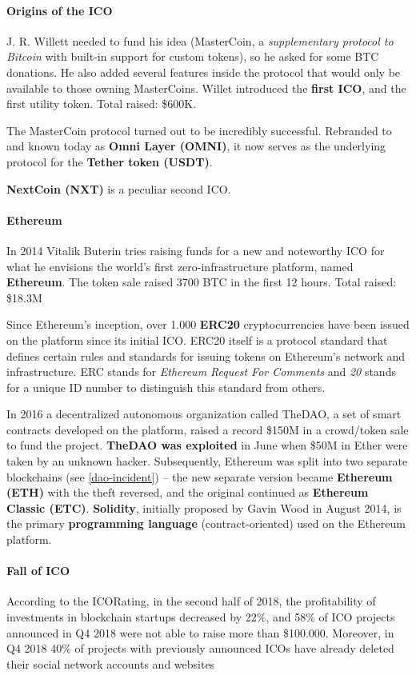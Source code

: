 \paragraph{Origins of the ICO} J. R. Willett needed to fund his idea (MasterCoin, a \emph{supplementary protocol to Bitcoin} with built-in support for custom tokens), so he asked for some BTC donations. He also added several features inside the protocol that would only be available to those owning MasterCoins.
Willet introduced the \textbf{first ICO}, and the first utility token.
Total raised: \$600K.

The MasterCoin protocol turned out to be incredibly successful. Rebranded to and known today as \textbf{Omni Layer (OMNI)}, it now serves as the underlying protocol for the \textbf{Tether token (USDT)}.

\textbf{NextCoin (NXT)} is a peculiar second ICO.

\paragraph{Ethereum}
In 2014 Vitalik Buterin tries raising funds for a new and noteworthy ICO for what he envisions the world's first zero-infrastructure platform, named \textbf{Ethereum}.
The token sale raised 3700 BTC in the first 12 hours.
Total raised: \$18.3M

Since Ethereum's inception, over 1.000 \textbf{ERC20} cryptocurrencies have been issued on the platform since its initial ICO. ERC20 itself is a protocol standard that defines certain rules and standards for issuing tokens on Ethereum's network and infrastructure. ERC stands for \emph{Ethereum Request For Comments} and \emph{20} stands for a unique ID number to distinguish this standard from others.

In 2016 a decentralized autonomous organization called TheDAO, a set of smart contracts developed on the platform, raised a record \$150M in a crowd/token sale to fund the project. \textbf{TheDAO was exploited} in June when \$50M in Ether were taken by an unknown hacker. Subsequently, Ethereum was split into two separate blockchains (see \ref{dao-incident}) -- the new separate version became \textbf{Ethereum (ETH)} with the theft reversed, and the original continued as \textbf{Ethereum Classic (ETC)}.
\textbf{Solidity}, initially proposed by Gavin Wood in August 2014, is the primary \textbf{programming language} (contract-oriented) used on the Ethereum platform.

\paragraph{Fall of ICO}
According to the ICORating, in the second half of 2018, the profitability of investments in blockchain startups decreased by 22\%, and 58\% of ICO projects announced in Q4 2018 were not able to raise more than \$100.000. Moreover, in Q4 2018 40\% of projects with previously announced ICOs have already deleted their social network accounts and websites

